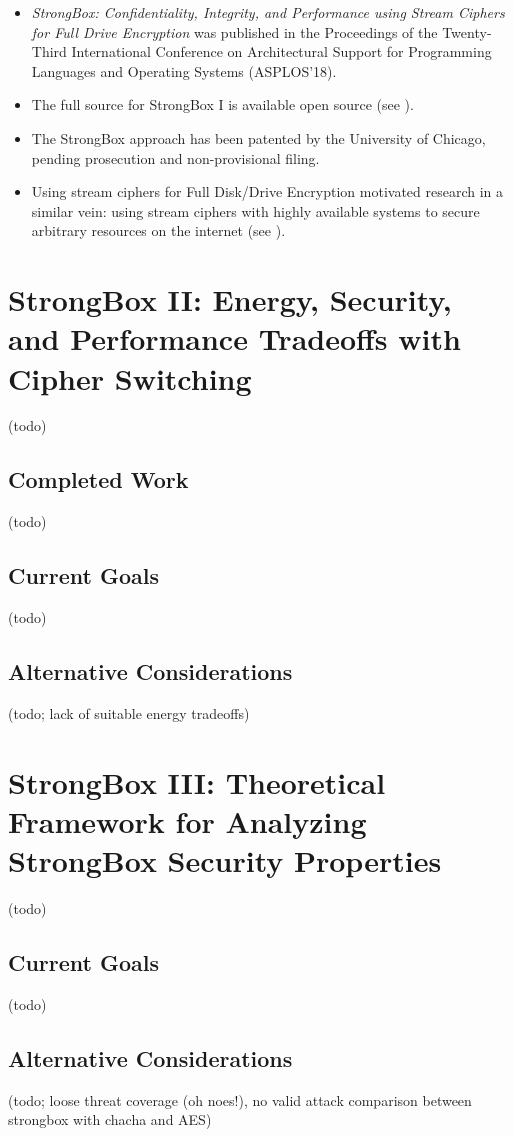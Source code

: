 \begin{itemize}
    \item \textit{StrongBox: Confidentiality, Integrity, and Performance using
    Stream Ciphers for Full Drive Encryption} was published in the Proceedings
    of the Twenty-Third International Conference on Architectural Support for
    Programming Languages and Operating Systems (ASPLOS'18).

    \item The full source for StrongBox I is available open source (see
    ).

    \item The StrongBox approach has been patented by the University of Chicago,
    pending prosecution and non-provisional filing.

    \item Using stream ciphers for Full Disk/Drive Encryption motivated research
    in a similar vein: using stream ciphers with highly available systems to
    secure arbitrary resources on the internet (see ).
\end{itemize}

\section{StrongBox II: Energy, Security, and Performance Tradeoffs with Cipher Switching}

(todo)

\subsection{Completed Work}

(todo)

\subsection{Current Goals}

(todo)

\subsection{Alternative Considerations}

(todo; lack of suitable energy tradeoffs)

\section{StrongBox III: Theoretical Framework for Analyzing StrongBox Security Properties}

(todo)

\subsection{Current Goals}

(todo)

\subsection{Alternative Considerations}

(todo; loose threat coverage (oh noes!), no valid attack comparison between
strongbox with chacha and AES)
